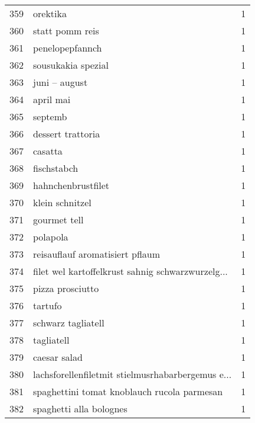 \begin{tabular}{llr}
359 &                                           orektika &      1 \\
360 &                                    statt pomm reis &      1 \\
361 &                                    penelopepfannch &      1 \\
362 &                                 sousukakia spezial &      1 \\
363 &                                      juni – august &      1 \\
364 &                                          april mai &      1 \\
365 &                                            septemb &      1 \\
366 &                                  dessert trattoria &      1 \\
367 &                                            casatta &      1 \\
368 &                                        fischstabch &      1 \\
369 &                                 hahnchenbrustfilet &      1 \\
370 &                                    klein schnitzel &      1 \\
371 &                                       gourmet tell &      1 \\
372 &                                           polapola &      1 \\
373 &                    reisauflauf aromatisiert pflaum &      1 \\
374 &  filet wel kartoffelkrust sahnig schwarzwurzelg... &      1 \\
375 &                                   pizza prosciutto &      1 \\
376 &                                            tartufo &      1 \\
377 &                                 schwarz tagliatell &      1 \\
378 &                                         tagliatell &      1 \\
379 &                                       caesar salad &      1 \\
380 &  lachsforellenfiletmit stielmusrhabarbergemus e... &      1 \\
381 &        spaghettini tomat knoblauch rucola parmesan &      1 \\
382 &                            spaghetti alla bolognes &      1 \\

\end{tabular}
